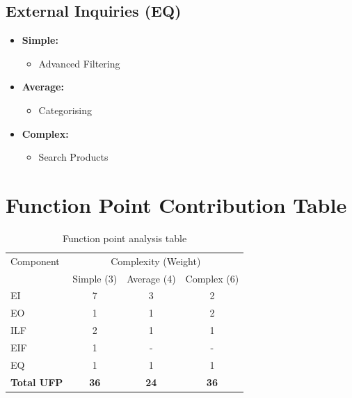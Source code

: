 \documentclass[a4paper,12pt]{article}
\begin{document}
\subsection{External Inquiries (EQ)}
\begin{itemize}
    \item \textbf{Simple:} 
    \begin{itemize}
        \item Advanced Filtering
    \end{itemize}
    \item \textbf{Average:}
    \begin{itemize}
        \item Categorising
    \end{itemize}
    \item \textbf{Complex:}
    \begin{itemize}
        \item Search Products
    \end{itemize}
\end{itemize}

\newpage
\section{Function Point Contribution Table}

\begin{table}[h]
    \centering
    \renewcommand{\arraystretch}{1.5} %
    \label{tab:fpa}
    \begin{tabular}{lccc}
        \hline
        Component & \multicolumn{3}{c}{Complexity (Weight)} \\
        \cline{2-4}
        & Simple (3) & Average (4) & Complex (6) \\
        \hline
        EI & 7 & 3 & 2 \\
        EO & 1 & 1 & 2 \\
        ILF & 2 & 1 & 1 \\
        EIF & 1 & - & - \\
        EQ & 1 & 1 & 1 \\
        \textbf{Total UFP} & \textbf{36} & \textbf{24} & \textbf{36} \\
        \hline
    \end{tabular}
    
    \caption{Function point analysis table}
\end{table}
\end{document}

